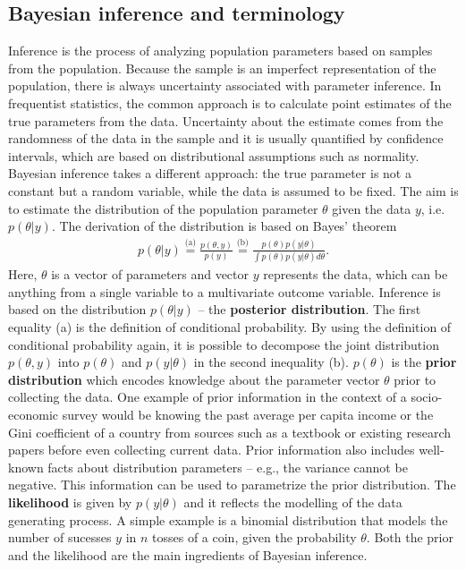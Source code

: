 \subsection{Bayesian inference and terminology}

Inference is the process of analyzing population parameters based on samples from the population.
Because the sample is an imperfect representation of the population, there is always uncertainty associated with parameter inference.
In frequentist statistics, the common approach is to calculate point estimates of the true parameters from the data.
Uncertainty about the estimate comes from the randomness of the data in the sample and it is usually quantified by confidence intervals, which are based on distributional assumptions such as normality.
Bayesian inference takes a different approach: the true parameter is not a constant but a random variable, while the data is assumed to be fixed.
The aim is to estimate the distribution of the population parameter $\theta$ given the data $y$, i.e. $p(\theta|y)$.
The derivation of the distribution is based on Bayes' theorem
\begin{gather*}
	\displaystyle p(\theta | y) \overset {\text{(a)}}{=}  \frac {p(\theta, y)}{p(y)} \overset {\text{(b)}}{=} \frac {p(\theta) p(y|\theta)}{\int p(\theta) p(y|\theta)d\theta}.
\end{gather*}
Here, $\theta$ is a vector of parameters and vector $y$ represents the data, which can be anything from a single variable to a multivariate outcome variable.
Inference is based on the distribution $p(\theta | y )$ – the \textbf{posterior distribution}.
The first equality (a) is the definition of conditional probability.
By using the definition of conditional probability again, it is possible to decompose the joint distribution $p(\theta, y)$ into $p(\theta)$ and $p(y|\theta)$ in the second inequality (b).
$p(\theta)$ is the \textbf{prior distribution} which encodes knowledge about the parameter vector $\theta$ prior to collecting the data.
One example of prior information in the context of a socio-economic survey would be knowing the past average per capita income or the Gini coefficient of a country from sources such as a textbook or existing research papers before even collecting current data.
Prior information also includes well-known facts about distribution parameters – e.g., the variance cannot be negative.
This information can be used to parametrize the prior distribution.
The \textbf{likelihood} is given by $p(y | \theta)$ and it reflects the modelling of the data generating process.
A simple example is a binomial distribution that models the number of sucesses $y$ in $n$ tosses of a coin, given the probability $\theta$.
Both the prior and the likelihood are the main ingredients of Bayesian inference.

